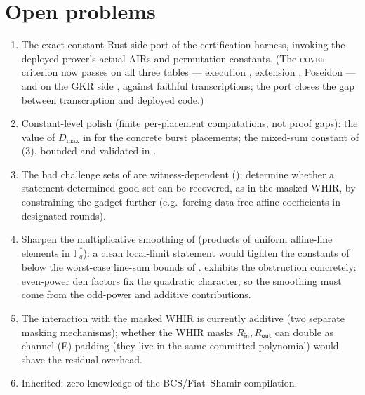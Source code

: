 \documentclass{article}
\newcommand{\Fq}{\mathbb{F}_q}
\theoremstyle{definition}
\begin{document}
\section{Open problems}

\begin{enumerate}
    \item The exact-constant Rust-side port of the certification harness, invoking the deployed prover's actual AIRs and permutation constants. (The \textsc{cover} criterion now passes on all three tables --- execution , extension , Poseidon  --- and on the GKR side , against faithful transcriptions; the port closes the gap between transcription and deployed code.)
    \item Constant-level polish (finite per-placement computations, not proof gaps): the value of $D_{\max}$ in  for the concrete burst placements; the mixed-sum constant of (3), bounded and validated in .
    \item The bad challenge sets of  are witness-dependent (); determine whether a statement-determined good set can be recovered, as in the masked WHIR, by constraining the gadget further (e.g.\ forcing data-free affine coefficients in designated rounds).
    \item Sharpen the multiplicative smoothing of  (products of uniform affine-line elements in $\Fq^*$): a clean local-limit statement would tighten the constants of  below the worst-case line-sum bounds of .  exhibits the obstruction concretely: even-power den factors fix the quadratic character, so the smoothing must come from the odd-power and additive contributions.
    \item The interaction with the masked WHIR is currently additive (two separate masking mechanisms); whether the WHIR masks $R_{\mathsf{in}}, R_{\mathsf{out}}$ can double as channel-(E) padding (they live in the same committed polynomial) would shave the residual overhead.
    \item Inherited: zero-knowledge of the BCS/Fiat--Shamir compilation.
\end{enumerate}



\end{document}
